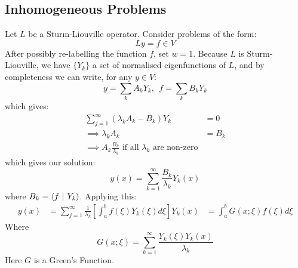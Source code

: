 \documentclass[../Main.tex]{subfiles}
\begin{document}
\subsection{Inhomogeneous Problems}
Let $L$ be a Sturm-Liouville operator. Consider problems of the form:
\begin{equation*}
    Ly = f \in V
\end{equation*}
After possibly re-labelling the function $f$, set $w = 1$. Because $L$ is Sturm-Liouville, we have $\{Y_k\}$ a set of normalised eigenfunctions of $L$, and by completeness we can write, for any $y \in V$:
\begin{equation*}
    y = \sum_{k} A_k Y_k,~~f = \sum_k B_k Y_k
\end{equation*}
which gives:
\begin{align*}
    \sum_{j=1}^{\infty} (\lambda_k A_k - B_k) Y_k &= 0 \\
    \implies \lambda_k A_k &= B_k \\
    \implies A_k \frac{B_k}{\lambda_k} \text{ if all } \lambda_k \text{ are non-zero}
\end{align*}
which gives our solution:
\begin{equation*}
    y(x) = \sum_{k=1}^{\infty} \frac{B_k}{\lambda_k} Y_k(x)
\end{equation*}
where $B_k = \langle f~\vert~Y_k\rangle$. Applying this:
\begin{align*}
    y(x) &= \sum_{j=1}^{\infty} \frac{1}{\lambda_k} \left[\int_{a}^{b} f(\xi) Y_k(\xi) d\xi \right]Y_k(x)
    &= \int_{a}^{b} G(x;\xi) f(\xi) d\xi 
\end{align*}
Where
\begin{equation*}
    G(x;\xi) = \sum_{k=1}^{\infty} \frac{Y_k(\xi)Y_k(x)}{\lambda_k}
\end{equation*}
Here $G$ is a Green's Function.
\end{document}

